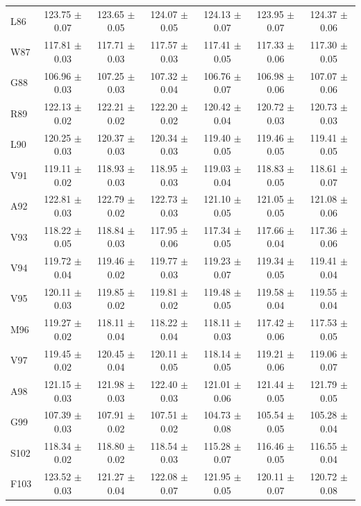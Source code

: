 \documentclass[%
 aip,
 amsmath,amssymb,
 preprint,%
]{revtex4-1}
\begin{document}
\begin{center}
\begin{longtable}{l|c|c|c|c|c|c}
L86 & 123.75 $\pm$ 0.07 & 123.65 $\pm$ 0.05 & 124.07 $\pm$ 0.05 & 124.13 $\pm$ 0.07 & 123.95 $\pm$ 0.07 & 124.37 $\pm$ 0.06 \\
W87 & 117.81 $\pm$ 0.03 & 117.71 $\pm$ 0.03 & 117.57 $\pm$ 0.03 & 117.41 $\pm$ 0.05 & 117.33 $\pm$ 0.06 & 117.30 $\pm$ 0.05 \\
G88 & 106.96 $\pm$ 0.03 & 107.25 $\pm$ 0.03 & 107.32 $\pm$ 0.04 & 106.76 $\pm$ 0.07 & 106.98 $\pm$ 0.06 & 107.07 $\pm$ 0.06 \\
R89 & 122.13 $\pm$ 0.02 & 122.21 $\pm$ 0.02 & 122.20 $\pm$ 0.02 & 120.42 $\pm$ 0.04 & 120.72 $\pm$ 0.03 & 120.73 $\pm$ 0.03 \\
L90 & 120.25 $\pm$ 0.03 & 120.37 $\pm$ 0.03 & 120.34 $\pm$ 0.03 & 119.40 $\pm$ 0.05 & 119.46 $\pm$ 0.05 & 119.41 $\pm$ 0.05 \\
V91 & 119.11 $\pm$ 0.02 & 118.93 $\pm$ 0.03 & 118.95 $\pm$ 0.03 & 119.03 $\pm$ 0.04 & 118.83 $\pm$ 0.05 & 118.61 $\pm$ 0.07 \\
A92 & 122.81 $\pm$ 0.03 & 122.79 $\pm$ 0.02 & 122.73 $\pm$ 0.03 & 121.10 $\pm$ 0.05 & 121.05 $\pm$ 0.05 & 121.08 $\pm$ 0.06 \\
V93 & 118.22 $\pm$ 0.05 & 118.84 $\pm$ 0.03 & 117.95 $\pm$ 0.06 & 117.34 $\pm$ 0.05 & 117.66 $\pm$ 0.04 & 117.36 $\pm$ 0.06 \\
V94 & 119.72 $\pm$ 0.04 & 119.46 $\pm$ 0.02 & 119.77 $\pm$ 0.03 & 119.23 $\pm$ 0.07 & 119.34 $\pm$ 0.05 & 119.41 $\pm$ 0.04 \\
V95 & 120.11 $\pm$ 0.03 & 119.85 $\pm$ 0.02 & 119.81 $\pm$ 0.02 & 119.48 $\pm$ 0.05 & 119.58 $\pm$ 0.04 & 119.55 $\pm$ 0.04 \\
M96 & 119.27 $\pm$ 0.02 & 118.11 $\pm$ 0.04 & 118.22 $\pm$ 0.04 & 118.11 $\pm$ 0.03 & 117.42 $\pm$ 0.06 & 117.53 $\pm$ 0.05 \\
V97 & 119.45 $\pm$ 0.02 & 120.45 $\pm$ 0.04 & 120.11 $\pm$ 0.05 & 118.14 $\pm$ 0.05 & 119.21 $\pm$ 0.06 & 119.06 $\pm$ 0.07 \\
A98 & 121.15 $\pm$ 0.03 & 121.98 $\pm$ 0.03 & 122.40 $\pm$ 0.03 & 121.01 $\pm$ 0.06 & 121.44 $\pm$ 0.05 & 121.79 $\pm$ 0.05 \\
G99 & 107.39 $\pm$ 0.03 & 107.91 $\pm$ 0.02 & 107.51 $\pm$ 0.02 & 104.73 $\pm$ 0.08 & 105.54 $\pm$ 0.05 & 105.28 $\pm$ 0.04 \\
S102 & 118.34 $\pm$ 0.02 & 118.80 $\pm$ 0.02 & 118.54 $\pm$ 0.03 & 115.28 $\pm$ 0.07 & 116.46 $\pm$ 0.05 & 116.55 $\pm$ 0.04 \\
F103 & 123.52 $\pm$ 0.03 & 121.27 $\pm$ 0.04 & 122.08 $\pm$ 0.07 & 121.95 $\pm$ 0.05 & 120.11 $\pm$ 0.07 & 120.72 $\pm$ 0.08 \\

\end{longtable}
\end{center}
\end{document}
